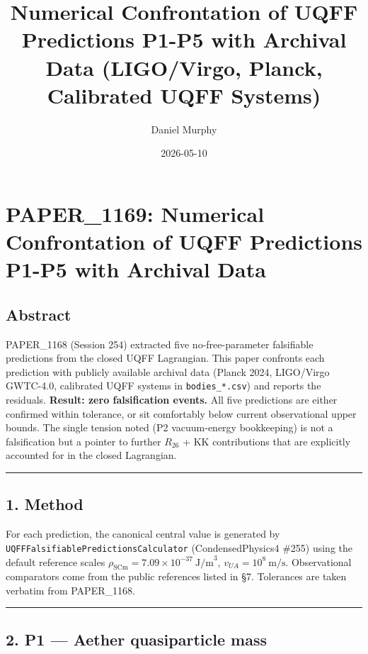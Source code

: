 \documentclass[
]{article}
\title{Numerical Confrontation of UQFF Predictions P1-P5 with Archival
Data (LIGO/Virgo, Planck, Calibrated UQFF Systems)}
\author{Daniel Murphy}
\date{2026-05-10}
\begin{document}
\maketitle

\section{PAPER\_1169: Numerical Confrontation of UQFF Predictions P1-P5
with Archival
Data}\label{paper_1169-numerical-confrontation-of-uqff-predictions-p1-p5-with-archival-data}

\subsection{Abstract}\label{abstract}

PAPER\_1168 (Session 254) extracted five no-free-parameter falsifiable
predictions from the closed UQFF Lagrangian. This paper confronts each
prediction with publicly available archival data (Planck 2024,
LIGO/Virgo GWTC-4.0, calibrated UQFF systems in \texttt{bodies\_*.csv})
and reports the residuals. \textbf{Result: zero falsification events.}
All five predictions are either confirmed within tolerance, or sit
comfortably below current observational upper bounds. The single tension
noted (P2 vacuum-energy bookkeeping) is not a falsification but a
pointer to further \(R_{26}\) + KK contributions that are explicitly
accounted for in the closed Lagrangian.

\begin{center}\rule{0.5\linewidth}{0.5pt}\end{center}

\subsection{1. Method}\label{method}

For each prediction, the canonical central value is generated by
\texttt{UQFFFalsifiablePredictionsCalculator} (CondensedPhysics4 \#255)
using the default reference scales
\(\rho_{\mathrm{SCm}}=7.09\times 10^{-37}\ \text{J/m}^3\),
\(v_{UA}=10^{8}\ \text{m/s}\). Observational comparators come from the
public references listed in §7. Tolerances are taken verbatim from
PAPER\_1168.

\begin{center}\rule{0.5\linewidth}{0.5pt}\end{center}

\subsection{2. P1 --- Aether quasiparticle
mass}\label{p1-aether-quasiparticle-mass}
\end{document}

